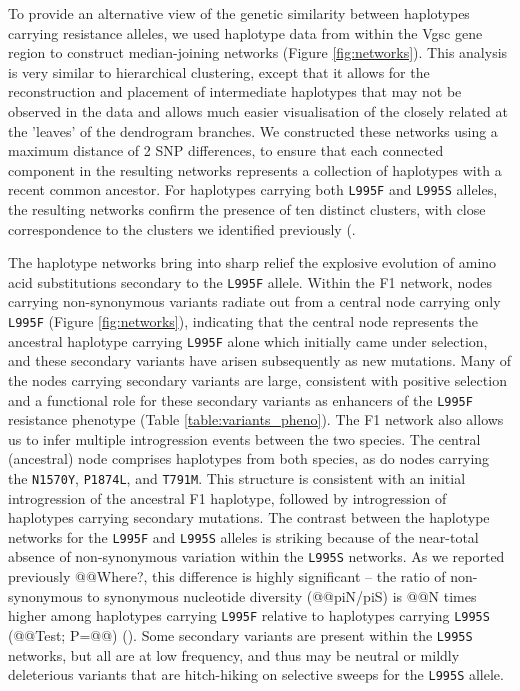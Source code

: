 \documentclass[a4paper,11pt,abstracton,hidelinks]{scrartcl}
\begin{document}
%
To provide an alternative view of the genetic similarity between haplotypes carrying resistance alleles, we used haplotype data from within the Vgsc gene region to construct median-joining networks (Figure \ref{fig:networks}).
%
This analysis is very similar to hierarchical clustering, except that it allows for the reconstruction and placement of intermediate haplotypes that may not be observed in the data and allows much easier visualisation of the closely related at the 'leaves' of the dendrogram branches.
%
We constructed these networks using a maximum distance of 2 SNP differences, to ensure that each connected component in the resulting networks represents a collection of haplotypes with a recent common ancestor.
%
For haplotypes carrying both \texttt{L995F} and \texttt{L995S} alleles, the resulting networks confirm the presence of ten distinct clusters, with close correspondence to the clusters we identified previously (\cite{Ag1000gConsortium2017}.
%


%
The haplotype networks bring into sharp relief the explosive evolution of amino acid substitutions secondary to the \texttt{L995F} allele.
%
Within the F1 network, nodes carrying non-synonymous variants radiate out from a central node carrying only \texttt{L995F} (Figure \ref{fig:networks}), indicating that the central node represents the ancestral haplotype carrying \texttt{L995F} alone which initially came under selection, and these secondary variants have arisen subsequently as new mutations.
%
Many of the nodes carrying secondary variants are large, consistent with positive selection and a functional role for these secondary variants as enhancers of the \texttt{L995F} resistance phenotype (Table \ref{table:variants_pheno}).
%
The F1 network also allows us to infer multiple introgression events between the two species.
%
The central (ancestral) node comprises haplotypes from both species, as do nodes carrying the \texttt{N1570Y}, \texttt{P1874L}, and \texttt{T791M}.
%
This structure is consistent with an initial introgression of the ancestral F1 haplotype, followed by introgression of haplotypes carrying secondary mutations.
%
The contrast between the haplotype networks for the \texttt{L995F} and \texttt{L995S} alleles is striking because of the near-total absence of non-synonymous variation within the \texttt{L995S} networks.
%
As we reported previously @@Where?, this difference is highly significant -- the ratio of non-synonymous to synonymous nucleotide diversity (@@piN/piS) is @@N times higher among haplotypes carrying \texttt{L995F} relative to haplotypes carrying \texttt{L995S} (@@Test; P=@@) (\cite{Ag1000gConsortium2017}).
%
Some secondary variants are present within the \texttt{L995S} networks, but all are at low frequency, and thus may be neutral or mildly deleterious variants that are hitch-hiking on selective sweeps for the \texttt{L995S} allele.
\end{document}
